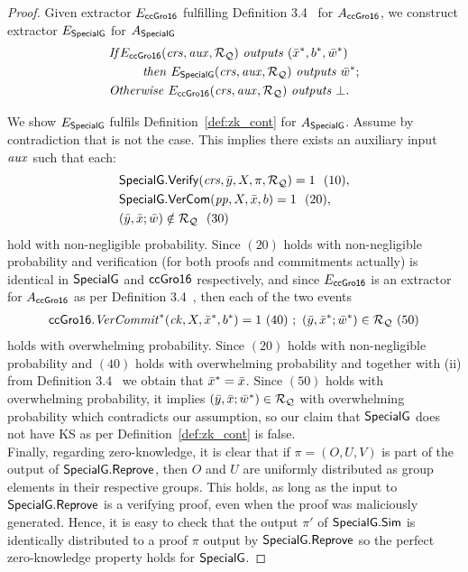 \begin{proof}
\noindent Given extractor $E_{{\mathsf{ccGro16}}}$ fulfilling Definition 3.4~\cite{LegoSNARK} for $A_{{\mathsf{ccGro16}}}$, we
construct extractor $E_{{\mathsf{SpecialG}}}$ for $A_{{\mathsf{SpecialG}}}$
\begin{align*}
&\mathit{If} E_{\ccgroth} (\crs, \realaux, \relRQ)\ \mathit{outputs} \ (\barx^*, b^*, \baromega^*) \\
& \ \ \ \ \ \ \ \ \mathit{then} \ E_{\SpecialG} (\crs, \realaux, \relRQ) \ \mathit{outputs} \ \baromega^*; \\
& \mathit{Otherwise} \ E_{\ccgroth}(\crs, \realaux, \relRQ) \ \mathit{outputs} \ \bot.
\end{align*}

We show $E_{{\mathsf{SpecialG}}}$ fulfils Definition~\ref{def:zk_cont} for $A_{{\mathsf{SpecialG}}}$. Assume by contradiction that is not the case. 
This implies there exists an auxiliary input $\mathit{aux}$ such that each: 
\begin{align*}
&{\mathsf{SpecialG}}.{\mathsf{Verify}}(\mathit{crs}, \bar{y}, X, \pi, \mathcal{R}_{\mathcal{Q}}) =1 \ \ (10), \\
& {\mathsf{SpecialG}}.{\mathsf{VerCom}}(\mathit{pp}, X, \bar{x}, b) =1 \ \ (20), \\
& (\bar{y}, \bar{x}; \bar{w}) \notin \mathcal{R}_{\mathcal{Q}}  \ \ (30) 
\end{align*}
hold with non-negligible probability. Since $(20)$ holds with non-negligible probability and verification (for both proofs and commitments actually) is identical in ${\mathsf{SpecialG}}$ and ${\mathsf{ccGro16}}$ respectively, 
and since $E_{{\mathsf{ccGro16}}}$ is an extractor for $A_{{\mathsf{ccGro16}}}$ as per Definition 3.4~\cite{LegoSNARK},
 then each of the two events 
\begin{align*}
\mathit{{\mathsf{ccGro16}}.\mathit{VerCommit}^*}(\mathit{ck}, X, \bar{x}^*, b^*) =1 \ (40) \ ; \ (\bar{y}, \bar{x}^*; \bar{w}^*) \in  \mathcal{R}_{\mathcal{Q}} \ (50)
\end{align*}
holds with overwhelming probability. Since $(20)$ holds with non-negligible probability and $(40)$ holds with overwhelming probability and 
together with (ii) from Definition 3.4~\cite{LegoSNARK} we obtain that $\bar{x}^* = \bar{x}$. Since $(50)$ holds with overwhelming probability, it implies 
$(\bar{y}, \bar{x}; \bar{w}^*) \in \mathcal{R}_{\mathcal{Q}} $ with overwhelming probability which contradicts our assumption, so our claim that ${\mathsf{SpecialG}}$ does not have 
KS as per Definition~\ref{def:zk_cont} is false. \\

\noindent Finally, regarding zero-knowledge, it is clear that if $\pi = (O, U, V)$ is part of the output of ${\mathsf{SpecialG}}.{\mathsf{Reprove}}$, 
then $O$ and $U$ are uniformly distributed as group elements in their respective groups. This holds, as long as the 
input to ${\mathsf{SpecialG}}.{\mathsf{Reprove}}$ is a verifying proof, even when the proof was maliciously generated. Hence, it is easy to check  
that the output $\pi'$ of ${\mathsf{SpecialG}}.{\mathsf{Sim}}$ is identically distributed to a proof $\pi$ output by ${\mathsf{SpecialG}}.{\mathsf{Reprove}}$ so the perfect 
zero-knowledge property holds for ${\mathsf{SpecialG}}$. 
\end{proof}


